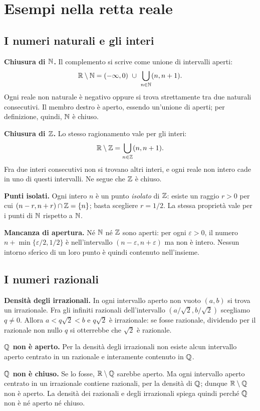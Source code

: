 \section{Esempi nella retta reale}

\subsection{I numeri naturali e gli interi}

\textbf{Chiusura di $\mathbb{N}$.} Il complemento si scrive come unione di intervalli aperti:
\[
  \mathbb{R}\setminus\mathbb{N}=(-\infty,0)\ \cup\
  \bigcup_{n\in\mathbb{N}}(n,n+1).
\]
Ogni reale non naturale è negativo oppure si trova strettamente tra due naturali consecutivi. Il membro destro è aperto, essendo un'unione di aperti; per definizione, quindi, $\mathbb{N}$ è chiuso.

\textbf{Chiusura di $\mathbb{Z}$.} Lo stesso ragionamento vale per gli interi:
\[
  \mathbb{R}\setminus\mathbb{Z}=\bigcup_{n\in\mathbb{Z}}(n,n+1).
\]
Fra due interi consecutivi non si trovano altri interi, e ogni reale non intero cade in uno di questi intervalli. Ne segue che $\mathbb{Z}$ è chiuso.

\textbf{Punti isolati.} Ogni intero $n$ è un punto \emph{isolato} di $\mathbb{Z}$: esiste un raggio $r>0$ per cui $(n-r,n+r)\cap\mathbb{Z}=\{n\}$; basta scegliere $r=1/2$. La stessa proprietà vale per i punti di $\mathbb{N}$ rispetto a $\mathbb{N}$.

\textbf{Mancanza di apertura.} Né $\mathbb{N}$ né $\mathbb{Z}$ sono aperti: per ogni $\varepsilon>0$, il numero $n+\min\{\varepsilon/2,1/2\}$ è nell'intervallo $(n-\varepsilon,n+\varepsilon)$ ma non è intero. Nessun intorno sferico di un loro punto è quindi contenuto nell'insieme.

\subsection{I numeri razionali}

\textbf{Densità degli irrazionali.} In ogni intervallo aperto non vuoto $(a,b)$ si trova un irrazionale. Fra gli infiniti razionali dell'intervallo $(a/\sqrt2,b/\sqrt2)$ scegliamo $q\ne0$. Allora $a<q\sqrt2<b$ e $q\sqrt2$ è irrazionale: se fosse razionale, dividendo per il razionale non nullo $q$ si otterrebbe che $\sqrt2$ è razionale.

\textbf{$\mathbb{Q}$ non è aperto.} Per la densità degli irrazionali non esiste alcun intervallo aperto centrato in un razionale e interamente contenuto in $\mathbb{Q}$.

\textbf{$\mathbb{Q}$ non è chiuso.} Se lo fosse, $\mathbb{R}\setminus\mathbb{Q}$ sarebbe aperto. Ma ogni intervallo aperto centrato in un irrazionale contiene razionali, per la densità di $\mathbb{Q}$; dunque $\mathbb{R}\setminus\mathbb{Q}$ non è aperto. La densità dei razionali e degli irrazionali spiega quindi perché $\mathbb{Q}$ non è né aperto né chiuso.

